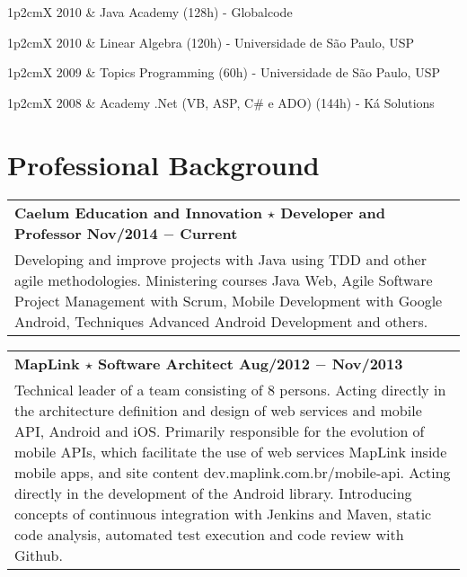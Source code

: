 \documentclass[a4paper, oneside, final]{scrartcl}
\newcommand{\vspc}{\vspace{0.15cm}} %
\newcommand{\vspcitem}{\vspace{0.1cm}} %
\begin{document}
\begin{center}
\begin{tabularx}{1\linewidth}{p{2cm}X}
2010       & Java Academy (128h) - Globalcode \vspcitem\\
\end{tabularx}

\begin{tabularx}{1\linewidth}{p{2cm}X}
2010       & Linear Algebra (120h) - Universidade de São Paulo, USP \vspcitem\\
\end{tabularx}

\begin{tabularx}{1\linewidth}{p{2cm}X}
2009       & Topics Programming (60h) - Universidade de São Paulo, USP \vspcitem\\
\end{tabularx}

\begin{tabularx}{1\linewidth}{p{2cm}X}
2008       & Academy .Net (VB, ASP, C\# e ADO) (144h) - Ká Solutions 
\end{tabularx}

\section{Professional Background}
\begin{tabularx}{1\linewidth}{X}
{\bf Caelum Education and Innovation $\star$ Developer and Professor \hfill Nov/2014 $-$ Current} \\
Developing and improve projects with Java using TDD and other agile methodologies. Ministering courses Java Web, Agile Software Project Management with Scrum, Mobile Development with Google Android, Techniques Advanced Android Development and others. \vspc\\
\end{tabularx}

\begin{tabularx}{1\linewidth}{X}
{\bf MapLink $\star$ Software Architect \hfill Aug/2012 $-$ Nov/2013} \\
Technical leader of a team consisting of 8 persons. Acting directly in the architecture definition and design of web services and mobile API, Android and iOS. Primarily responsible for the evolution of mobile APIs, which facilitate the use of web services MapLink inside mobile apps, and site content dev.maplink.com.br/mobile-api. Acting directly in the development of the Android library. Introducing concepts of continuous integration with Jenkins and Maven, static code analysis, automated test execution and code review with Github. \vspc\\
\end{tabularx}


\end{center}
\end{document}
